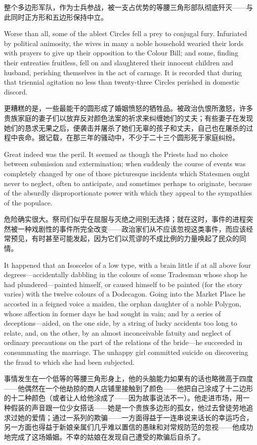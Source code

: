 \documentclass[12pt,UTF8]{ctexbook}
\begin{document}
整个多边形军队，作为士兵参战，被一支占优势的等腰三角形部队彻底歼灭——与此同时正方形和五边形保持中立。

Worse than all, some of the ablest Circles fell a prey to conjugal fury. Infuriated by political animosity, the wives in many a noble household wearied their lords with prayers to give up their opposition to the Colour Bill; and some, finding their entreaties fruitless, fell on and slaughtered their innocent children and husband, perishing themselves in the act of carnage. It is recorded that during that triennial agitation no less than twenty-three Circles perished in domestic discord.

更糟糕的是，一些最能干的圆形成了婚姻愤怒的牺牲品。被政治仇恨所激怒，许多贵族家庭的妻子们以放弃反对颜色法案的祈求来纠缠她们的丈夫；有些妻子在发现她们的恳求无果之后，便袭击并屠杀了她们无辜的孩子和丈夫，自己也在屠杀的过程中丧命。据记载，在那三年的骚动中，不少于二十三个圆形死于家庭纠纷。

Great indeed was the peril. It seemed as though the Priests had no choice between submission and extermination; when suddenly the course of events was completely changed by one of those picturesque incidents which Statesmen ought never to neglect, often to anticipate, and sometimes perhaps to originate, because of the absurdly disproportionate power with which they appeal to the sympathies of the populace.

危险确实很大。祭司们似乎在屈服与灭绝之间别无选择；就在这时，事件的进程突然被一种戏剧性的事件所完全改变——政治家们从不应该忽视这类事件，而应该经常预见，有时甚至可能发起，因为它们以荒谬的不成比例的力量唤起了民众的同情。

It happened that an Isosceles of a low type, with a brain little if at all above four degrees---accidentally dabbling in the colours of some Tradesman whose shop he had plundered---painted himself, or caused himself to be painted (for the story varies) with the twelve colours of a Dodecagon. Going into the Market Place he accosted in a feigned voice a maiden, the orphan daughter of a noble Polygon, whose affection in former days he had sought in vain; and by a series of deceptions---aided, on the one side, by a string of lucky accidents too long to relate, and, on the other, by an almost inconceivable fatuity and neglect of ordinary precautions on the part of the relations of the bride---he succeeded in consummating the marriage. The unhappy girl committed suicide on discovering the fraud to which she had been subjected.

事情发生在一个低等的等腰三角形身上，他的头脑能力如果有的话也略微高于四度——他偶然在一个他劫掠的商人店铺里接触到了颜色——他把自己涂成了十二边形的十二种颜色（或者让人给他涂成了——因为故事说法不一）。他走进市场，用一种假装的声音跟一位少女搭话——她是一个贵族多边形的孤女，他过去曾徒劳地追求过她的爱情；通过一系列的欺骗——一方面得益于一连串说来话长的幸运巧合，另一方面也得益于新娘亲属们几乎难以置信的愚昧和对常规防范的忽视——他成功地完成了这场婚姻。不幸的姑娘在发现自己遭受的欺骗后自杀了。
\end{document}
